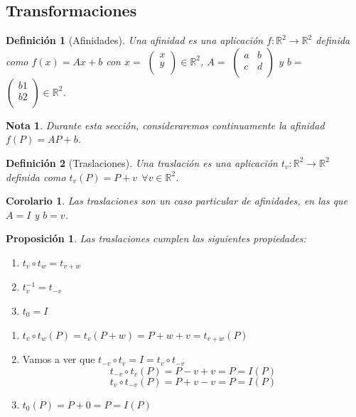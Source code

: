 \documentclass[11pt, a4paper]{article}
\makeatletter
\newif\IfInSansMode
\let\oldsf\sffamily
\renewcommand*{\sffamily}{\oldsf\mathversion{sans}\InSansModetrue}
\let\oldnorm\normalfont
\renewcommand*{\normalfont}{\oldnorm\InSansModefalse\mathversion{normal}}
\renewenvironment{proof}[1][\proofname] {\vspace{-15pt}\par\pushQED{\qed}\normalfont\topsep6\p@\@plus6\p@\relax\trivlist\item[\hskip\labelsep\it#1\@addpunct{.}]\ignorespaces}{\popQED\endtrivlist\@endpefalse}
\newcommand{\R}{\mathbb{R}}
\renewenvironment{proof}[1][\proofname] {\par\pushQED{\qed}\normalfont\topsep6\p@\@plus6\p@\relax\trivlist\item[\hskip\labelsep\itshape\sffamily#1\@addpunct{.}]\ignorespaces}{\popQED\endtrivlist\@endpefalse}
\theoremstyle{theorem-style}
\newtheorem{nprop}{Proposición}[section]
\newtheorem{ncor}{Corolario}[section]
\theoremstyle{definition-style}
\newtheorem{ndef}{Definición}[section]
\theoremstyle{remark-style}
\newtheorem*{nota}{Nota}
\theoremstyle{example-style}
\newenvironment{nlist}
{\begin{enumerate}
    \renewcommand\labelenumi{(\emph{\roman{enumi})}}}
  {\end{enumerate}}
\makeatother
\begin{document}
\subsection{Transformaciones}

\begin{ndef}[Afinidades]
  Una afinidad es una aplicación $f : \R^2 \rightarrow \R^2$ definida como $f(x) = Ax + b$ con $x =$ $\begin{pmatrix}
    x\\
    y\\
  \end{pmatrix} \in \R^2$, $A =$ $\begin{pmatrix}
    a & b\\
    c & d\\
  \end{pmatrix}$
  y $b =$ $\begin{pmatrix}
    b1\\
    b2\\
  \end{pmatrix} \in \R^2$.
\end{ndef}

\begin{nota}
  Durante esta sección, consideraremos continuamente la afinidad $f(P) = AP + b $.
\end{nota}

\begin{ndef}[Traslaciones]
  Una traslación es una aplicación $t_v: \R^2 \rightarrow \R^2$ definida como $t_v(P) = P + v \ \ \forall v \in \R^2$.
\end{ndef}

\begin{ncor}
    \item Las traslaciones son un caso particular de afinidades, en las que $A = I$ y $b = v$.
\end{ncor}

\begin{nprop}
  Las traslaciones cumplen las siguientes propiedades:
  \begin{nlist}
  \item $\displaystyle t_v \circ t_w = t_{v+w}$
  \item $t_{v}^{-1} = t_{-v}$
  \item $t_0 = I$
  \end{nlist}
\end{nprop}
\begin{proof}\hfill
  \begin{nlist}
  \item $t_v \circ t_w (P) = t_v(P+w) = P+w+v = t_{v+w}(P)$
  \item Vamos a ver que $t_{-v}\circ t_v = I = t_v \circ t_{-v}$
    $$
    t_{-v}\circ t_v (P) = P-v+v = P = I(P)$$
    $$t_v\circ t_{-v}(P) = P+v-v = P = I(P)
    $$
  \item $t_0(P) = P +0 = P = I(P)$
  \end{nlist}
\end{proof}
\end{document}
